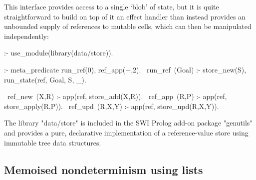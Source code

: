This interface provides access to a single `blob' of state, but it is quite 
straightforward to build on top of it an effect handler than instead provides an 
unbounded supply of references to mutable cells, which can then be manipulated independently:
\begin{prolog-framed}[name=ccstate]
  :- use_module(library(data/store)).

  :- meta_predicate run_ref(0), ref_app(+,2).
  ~run_ref~(Goal) :- store_new(S), run_state(ref, Goal, S, _).

  ~ref_new~(X,R)   :- app(ref, store_add(X,R)).
  ~ref_app~(R,P)   :- app(ref, store_apply(R,P)).
  ~ref_upd~(R,X,Y) :- app(ref, store_upd(R,X,Y)).
\end{prolog-framed}
The library "data/store" is included in the SWI Prolog add-on package "genutils"
and provides a pure, declarative implementation of a reference-value store using 
immutable tree data structures.

\subsection{Memoised nondeterminism using lists}
\label{sec:ccmemo}

